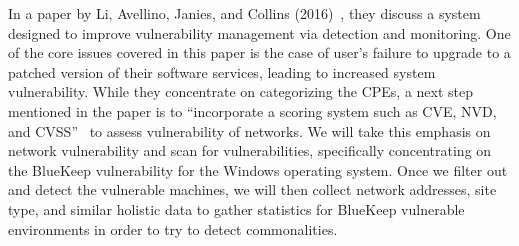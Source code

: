 In a paper by Li, Avellino, Janies, and Collins (2016)~\cite{li_avellino_janies_collins_2016}, they discuss a system designed to improve vulnerability management via detection and monitoring. One of the core issues covered in this paper is the case of user's failure to upgrade to a patched version of their software services, leading to increased system vulnerability. While they concentrate on categorizing the CPEs, a next step mentioned in the paper is to ``incorporate a scoring system such as CVE, NVD, and CVSS''~\cite{li_avellino_janies_collins_2016} to assess vulnerability of networks. We will take this emphasis on network vulnerability and scan for vulnerabilities, specifically concentrating on the BlueKeep vulnerability for the Windows operating system. Once we filter out and detect the vulnerable machines, we will then collect network addresses, site type, and similar holistic data to gather statistics for BlueKeep vulnerable environments in order to try to detect commonalities.